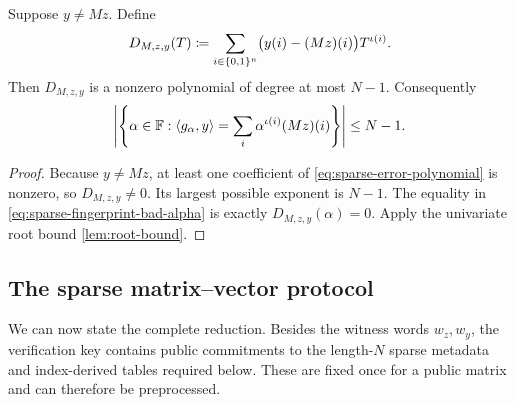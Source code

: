\begin{lemma}
\label{lem:sparse-geometric-fingerprint}
Suppose $y\ne Mz$.  Define
\begin{equation}
  D_{M,z,y}(T)
  \coloneqq
  \sum_{i\in\{0,1\}^n}
  \bigl(y(i)-(Mz)(i)\bigr)T^{\iota(i)}.
  \label{eq:sparse-error-polynomial}
\end{equation}
Then $D_{M,z,y}$ is a nonzero polynomial of degree at most $N-1$.  Consequently
\begin{equation}
  \left|
    \left\{
      \alpha\in\mathbb{F}:
      \left\langle g_\alpha,y\right\rangle
      =\sum_i\alpha^{\iota(i)}(Mz)(i)
    \right\}
  \right|
  \le N-1.
  \label{eq:sparse-fingerprint-bad-alpha}
\end{equation}
\end{lemma}

\begin{proof}
Because $y\ne Mz$, at least one coefficient of \eqref{eq:sparse-error-polynomial} is nonzero, so $D_{M,z,y}\ne0$.  Its largest possible exponent is $N-1$.  The equality in \eqref{eq:sparse-fingerprint-bad-alpha} is exactly $D_{M,z,y}(\alpha)=0$.  Apply the univariate root bound \cref{lem:root-bound}.
\end{proof}

\subsection{The sparse matrix--vector protocol}
\label{sec:sparse-matvec-protocol}

We can now state the complete reduction.  Besides the witness words $w_z,w_y$, the verification key contains public commitments to the length-$N$ sparse metadata and index-derived tables required below.  These are fixed once for a public matrix and can therefore be preprocessed.

